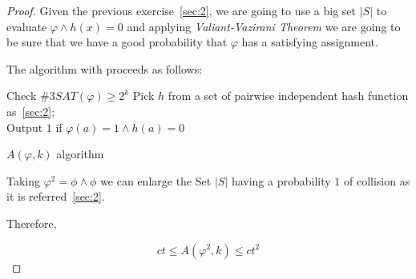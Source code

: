 \documentclass[12pt, a4paper]{article}
\begin{document}
\begin{proof}
Given the previous exercise~\ref{sec:2}, we are going to use a big set $|S|$ to evaluate $\varphi \land h(x) = 0$ and applying \textit{Valiant-Vazirani Theorem} we are going to be sure that we have a good probability that $\varphi$ has a satisfying assignment.

The algorithm with proceeds as follows:

\begin{algorithm}[H]
  {Check $\#3SAT(\varphi) \geq 2^{k}$
  }
  {Pick $h$ from a set of pairwise independent hash function as~\ref{sec:2};\\
    Output $1$ if $\varphi(a) = 1 \land h(a) = 0$
  }
  \caption{$A(\varphi, k)$ algorithm}
\end{algorithm}

Taking $\varphi^2 = \phi \land \phi$ we can enlarge the Set $|S|$ having a probability $1$ of collision as it is referred~\ref{sec:2}.

Therefore,

\begin{equation}
  ct \leq A(\varphi^2,k) \leq ct^2
\end{equation}

\end{proof}
\end{document}
